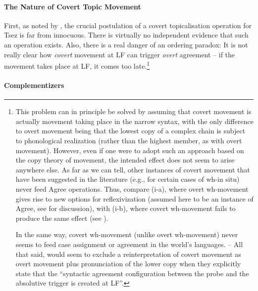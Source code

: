\documentclass[output=paper
,modfonts
,nonflat]{langsci/langscibook}
\begin{document}
\paragraph{The Nature of Covert Topic Movement}

First, as noted by \cite{Boskovic:07}, the crucial postulation of a
covert topicalisation operation for Tsez is far from innocuous. There
is virtually no independent evidence that such an operation
exists. Also, there is a real danger of an ordering paradox: It is not
really clear how {\itshape covert} movement at LF can trigger {\itshape overt}
agreement -- if the movement takes place at LF, it comes too
late.\footnote{This problem  can in principle be solved by assuming
  that covert movement is actually movement taking place in the
  narrow syntax, with the only difference to overt movement being that
  the lowest copy of a complex chain is subject to phonological
  realization (rather than the highest member, as with overt movement).
However, even if one were to adopt such an approach based on the copy
theory of movement, the intended effect does not seem to arise
anywhere else. As far as we can tell, other instances of covert
movement that have been suggested in the literature (e.g., for certain
cases of wh-in situ) never feed Agree operations. Thus, compare (i-a),
where overt wh-movement gives rise to new options for reflexivization
(assumed here to be an instance of Agree, see \cite{Reuland:11} for
discussion), with (i-b), where covert wh-movement fails to produce the
same effect (see \cite{Barss:86}). 

\ea\label{ex:mueller:Fn8}
\z
\z

In the same way, covert wh-movement (unlike overt wh-movement) never seems to feed case
assignment or agreement in the world's languages. -- 
All  that said, \citet[626]{Polinsky&Potsdam:01} would seem to 
exclude a reinterpretation of covert movement as overt movement plus
pronunciation of the lower copy when they explicitly state that the
``syntactic agreement configuration between the probe and the
absolutive trigger is created at LF''.}


\paragraph{Complementizers}
\end{document}
